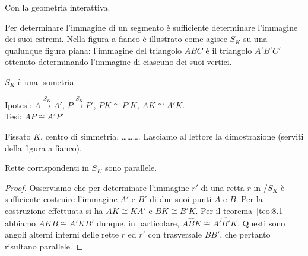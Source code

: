 Con la geometria interattiva.


\noindent\begin{minipage}{0.65\textwidth}\parindent15pt
Per determinare l'immagine di un segmento è sufficiente determinare 
l'immagine dei suoi estremi. Nella figura a fianco è illustrato come 
agisce $S_K$ su una qualunque figura piana: l'immagine del triangolo 
$ABC$ è il triangolo $A'B'C'$ ottenuto determinando l'immagine di 
ciascuno dei suoi vertici.
\end{minipage}\hfil
\begin{minipage}{0.35\textwidth}
  \centering
\end{minipage}

\begin{teorema}\label{teo:8.1}
$S_K$ è una isometria.
\end{teorema}

\noindent\begin{minipage}{0.65\textwidth}\parindent15pt
\noindent Ipotesi: $A\overset{S_K}{\rightarrow}A'$, 
$P\overset{S_K}{\rightarrow}P'$, $PK\cong P'K$, $AK\cong A'K$.\\
Tesi: $AP\cong A'P'$.

Fissato $K$, centro di simmetria, \ldots\ldots\ldots{}.
Lasciamo al lettore la dimostrazione (serviti della figura a fianco).
\end{minipage}\hfil
\begin{minipage}{0.35\textwidth}
  \centering
\end{minipage}

\begin{teorema}\label{teo:8.2}
Rette corrispondenti in $S_K$ sono parallele.
\end{teorema}

\noindent\begin{minipage}{0.65\textwidth}\parindent15pt
\begin{proof}
Osserviamo che per determinare l'immagine $r'$ di una retta $r$ in 
/$S_K$ è sufficiente costruire l'immagine $A'$ e $B'$ di due suoi 
punti $A$ e $B$. Per la costruzione effettuata si ha $AK\cong KA'$ e 
$BK\cong B'K$. Per il teorema~\ref{teo:8.1} abbiamo $AKB\cong A'KB'$ 
dunque, in particolare, $A\widehat{B}K\cong A'\widehat{B'}K$. Questi 
sono angoli alterni interni delle rette $r$ ed $r'$ con trasversale 
$BB'$, che pertanto risultano parallele.
\end{proof}
\end{minipage}\hfil
\begin{minipage}{0.35\textwidth}
  
\centering
\end{minipage}\vspace{8pt}

